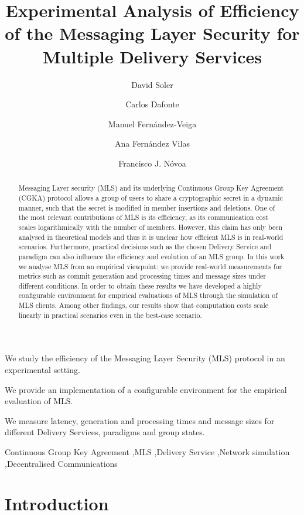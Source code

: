\documentclass[preprint, 12pt]{elsarticle}
\author[udc]{David Soler\corref{cor1}}
\author[udc]{Carlos Dafonte}
\author[uvigo]{Manuel Fernández-Veiga}
\author[uvigo]{Ana Fernández Vilas}
\author[udc]{Francisco J. Nóvoa}
\affiliation[udc]{organization={CITIC, Universidade da Coruña},
            city={A Coruña},
            country={Spain}}
\affiliation[uvigo]{organization={atlanTTic, Universidade de Vigo},
            city={Vigo},
            country={Spain}}
\title{Experimental Analysis of Efficiency of the Messaging Layer Security for Multiple Delivery Services}
\begin{document}
\begin{frontmatter}

\begin{abstract}
Messaging Layer security (MLS) and its underlying Continuous Group Key Agreement (CGKA) protocol allows a group of users to share a cryptographic secret in a dynamic manner, such that the secret is modified in member insertions and deletions. One of the most relevant contributions of MLS is its efficiency, as its communication cost scales logarithmically with the number of members. However, this claim has only been analysed in theoretical models and thus it is unclear how efficient MLS is in real-world scenarios. Furthermore, practical decisions such as the chosen Delivery Service and paradigm can also influence the efficiency and evolution of an MLS group. In this work we analyse MLS from an empirical viewpoint: we provide real-world measurements for metrics such as commit generation and processing times and message sizes under different conditions. In order to obtain these results we have developed a highly configurable environment for empirical evaluations of MLS through the simulation of MLS clients. Among other findings, our results show that computation costs scale linearly in practical scenarios even in the best-case scenario.
\end{abstract}

\begin{highlights}
\item We study the efficiency of the Messaging Layer Security (MLS) protocol in an experimental setting.
\item We provide an implementation of a configurable environment for the empirical evaluation of MLS. 
\item We measure latency, generation and processing times and message sizes for different Delivery Services, paradigms and group states.
\end{highlights}

\begin{keyword}
Continuous Group Key Agreement \sep MLS \sep Delivery Service \sep Network simulation
\sep Decentralised Communications 
\end{keyword}

\end{frontmatter}

\section{Introduction} 
\label{sec:introduction}
\end{document}
